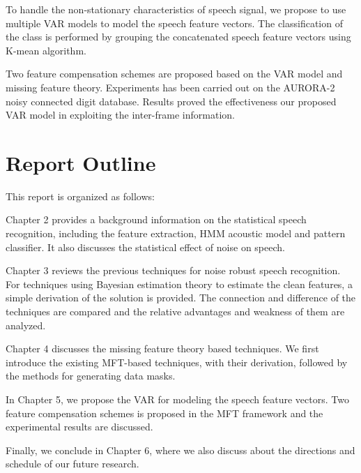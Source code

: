 To handle the non-stationary characteristics of speech signal, we
propose to use multiple VAR models to model the speech feature
vectors. The classification of the class is performed by grouping
the concatenated speech feature vectors using K-mean algorithm.

Two feature compensation schemes are proposed based on the VAR model
and missing feature theory. Experiments has been carried out on the
AURORA-2 noisy connected digit database. Results proved the
effectiveness our proposed VAR model in exploiting the inter-frame
information.

\section{Report Outline}
This report is organized as follows:

Chapter 2 provides a background information on the statistical
speech recognition, including the feature extraction, HMM acoustic
model and pattern classifier. It also discusses the statistical
effect of noise on speech.

Chapter 3 reviews the previous techniques for noise robust speech
recognition. For techniques using Bayesian estimation theory to
estimate the clean features, a simple derivation of the solution is
provided. The connection and difference of the techniques are
compared and the relative advantages and weakness of them are
analyzed.

Chapter 4 discusses the missing feature theory based techniques. We
first introduce the existing MFT-based techniques, with their
derivation, followed by the methods for generating data masks.

In Chapter 5, we propose the VAR for modeling the speech feature
vectors. Two feature compensation schemes is proposed in the MFT
framework and the experimental results are discussed.

Finally, we conclude in Chapter 6, where we also discuss about the
directions and schedule of our future research.
